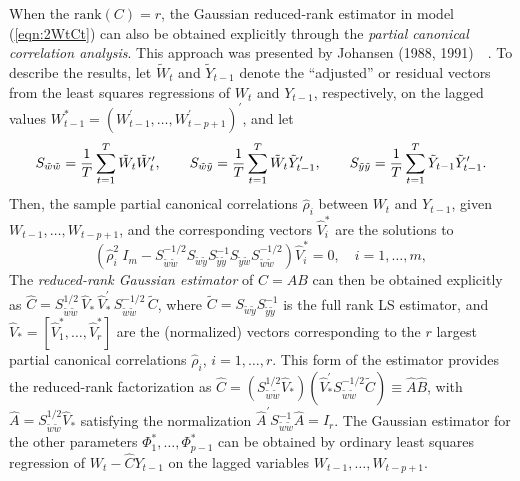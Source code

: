 When the  $\mbox{rank}(C)= r$, the Gaussian reduced-rank estimator in model (\ref{eqn:2WtCt}) can also be obtained explicitly through the \textit{partial canonical correlation analysis}. This approach was presented by Johansen (1988, 1991)~\cite{johansen1988statistical}~\cite{johansen1991estimation}.  To describe the results, let $\tilde{W}_t$ and $\tilde{Y}_{t-1}$ denote the ``adjusted'' or residual vectors from the least squares regressions of $W_t$ and $Y_{t-1}$, respectively, on the lagged values $W_{t-1}^*= (W_{t-1}^{\prime} ,\ldots, W_{t-p+1}^{\prime} )^{\prime} $, and let
	\[
	S_{ \tilde{w} \tilde{w} } = \frac{1}{T} \sum_{t=1}^T \tilde{W}_t
\tilde{W}_t^{\prime}, \qquad \hfill S_{ \tilde{w} \tilde{y} } = \frac{1}{T} \sum_{t=1}^T \tilde{W}_t
\tilde{Y}_{t-1}^{\prime} ,\qquad \hfill S_{ \tilde{y} \tilde{y} } = \frac{1}{T} \sum_{t=1}^T \tilde{Y}_{t-1}
\tilde{Y}_{t-1}^{\prime} . \hfill
	\]
Then, the sample partial canonical correlations $\hat{\rho}_i $ between $W_t$ and $Y_{t-1}$, given $W_{t-1} ,\ldots, W_{t-p+1} $, and the corresponding vectors $\hat{V}_i^*$ are the solutions to
	\begin{equation}\label{eqn:2rhohatM}
	(\hat{\rho}_i^2 \:I_m - S_{ \tilde{w} \tilde{w} }^{-1/2} S_{ \tilde{w} \tilde{y} } S_{ \tilde{y} \tilde{y} }^{-1} S_{ \tilde{y} \tilde{w} } S_{ \tilde{w} \tilde{w} }^{-1/2} )
\hat{V}_i^* = 0 , \quad i = 1 ,\ldots, m , 
	\end{equation}
The \textit{reduced-rank Gaussian estimator} of $C= A B$ can then be obtained explicitly as $\hat{C} = S_{\tilde{w} \tilde{w}}^{1/2}\, \hat{V}_* \,\hat{V}_*^{\prime}\, S_{\tilde{w} \tilde{w}}^{-1/2}\, \tilde{C}$, where $\tilde{C} = S_{ \tilde{w} \tilde{y}} S_{\tilde{y} \tilde{y}}^{-1} $ is the full rank LS estimator, and $\hat{V}_* = [ \hat{V}_1^* , \ldots, \hat{V}_r^* ]$ are the (normalized) vectors corresponding to the $r$ largest partial canonical correlations $\hat{\rho}_i $, $i = 1 ,\ldots, r$. This form of the estimator provides the reduced-rank factorization as $\hat{C} = (S_{\tilde{w} \tilde{w}}^{1/2} \hat{V}_* ) ( \hat{V}_*^{\prime} S_{\tilde{w} \tilde{w}}^{-1/2} \tilde{C} ) \equiv \hat{A} \hat{B}$, with $\hat{A} = S_{\tilde{w} \tilde{w}}^{1/2} \hat{V}_*$
satisfying the normalization $\hat{A}^{\prime} S_{\tilde{w} \tilde{w}}^{-1} \hat{A} = I_r$.  The Gaussian estimator for the other parameters $\Phi_1^* ,\ldots, \Phi_{p-1}^*$ can be obtained by ordinary least squares regression of $W_t - \hat{C} Y_{t-1} $ on the lagged variables $W_{t-1} ,\ldots, W_{t-p+1} $.


